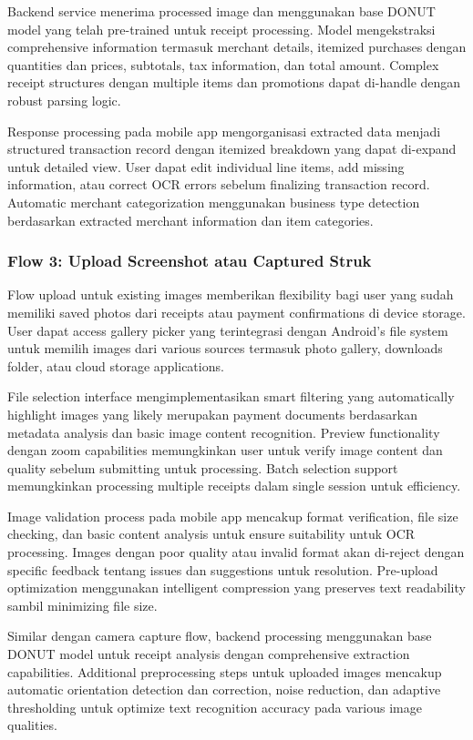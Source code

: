 Backend service menerima processed image dan menggunakan base DONUT model yang telah pre-trained untuk receipt processing. Model mengekstraksi comprehensive information termasuk merchant details, itemized purchases dengan quantities dan prices, subtotals, tax information, dan total amount. Complex receipt structures dengan multiple items dan promotions dapat di-handle dengan robust parsing logic.

Response processing pada mobile app mengorganisasi extracted data menjadi structured transaction record dengan itemized breakdown yang dapat di-expand untuk detailed view. User dapat edit individual line items, add missing information, atau correct OCR errors sebelum finalizing transaction record. Automatic merchant categorization menggunakan business type detection berdasarkan extracted merchant information dan item categories.

\subsubsection{Flow 3: Upload Screenshot atau Captured Struk}
\label{subsubsec:flow-upload-receipt}

Flow upload untuk existing images memberikan flexibility bagi user yang sudah memiliki saved photos dari receipts atau payment confirmations di device storage. User dapat access gallery picker yang terintegrasi dengan Android's file system untuk memilih images dari various sources termasuk photo gallery, downloads folder, atau cloud storage applications.

File selection interface mengimplementasikan smart filtering yang automatically highlight images yang likely merupakan payment documents berdasarkan metadata analysis dan basic image content recognition. Preview functionality dengan zoom capabilities memungkinkan user untuk verify image content dan quality sebelum submitting untuk processing. Batch selection support memungkinkan processing multiple receipts dalam single session untuk efficiency.

Image validation process pada mobile app mencakup format verification, file size checking, dan basic content analysis untuk ensure suitability untuk OCR processing. Images dengan poor quality atau invalid format akan di-reject dengan specific feedback tentang issues dan suggestions untuk resolution. Pre-upload optimization menggunakan intelligent compression yang preserves text readability sambil minimizing file size.

Similar dengan camera capture flow, backend processing menggunakan base DONUT model untuk receipt analysis dengan comprehensive extraction capabilities. Additional preprocessing steps untuk uploaded images mencakup automatic orientation detection dan correction, noise reduction, dan adaptive thresholding untuk optimize text recognition accuracy pada various image qualities.

